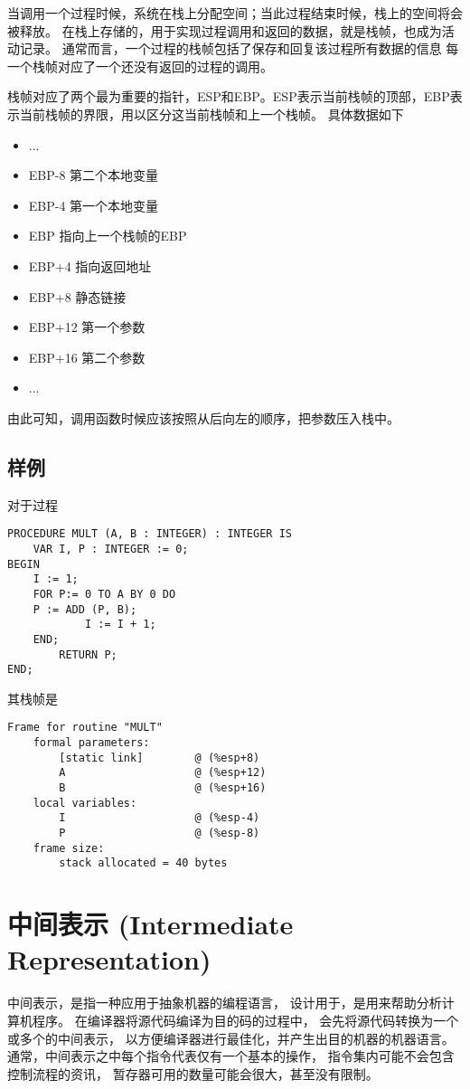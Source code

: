 ﻿\documentclass{article}
\begin{document}
当调用一个过程时候，系统在栈上分配空间；当此过程结束时候，栈上的空间将会被释放。
在栈上存储的，用于实现过程调用和返回的数据，就是栈帧，也成为活动记录。
通常而言，一个过程的栈帧包括了保存和回复该过程所有数据的信息
每一个栈帧对应了一个还没有返回的过程的调用。

栈帧对应了两个最为重要的指针，ESP和EBP。ESP表示当前栈帧的顶部，EBP表示当前栈帧的界限，用以区分这当前栈帧和上一个栈帧。
具体数据如下
\begin{itemize}
\item ...
\item{EBP-8} 第二个本地变量
\item{EBP-4} 第一个本地变量
\item{EBP} 指向上一个栈帧的EBP
\item{EBP+4} 指向返回地址
\item{EBP+8} 静态链接
\item{EBP+12} 第一个参数
\item{EBP+16} 第二个参数
\item ...
\end{itemize}

由此可知，调用函数时候应该按照从后向左的顺序，把参数压入栈中。

\subsection{样例}
对于过程
\begin{lstlisting}
PROCEDURE MULT (A, B : INTEGER) : INTEGER IS
    VAR I, P : INTEGER := 0;
BEGIN
    I := 1;
    FOR P:= 0 TO A BY 0 DO
    P := ADD (P, B);
            I := I + 1;
    END;
        RETURN P;
END;
\end{lstlisting}

其栈帧是
\begin{lstlisting}
Frame for routine "MULT"
    formal parameters:
        [static link]        @ (%esp+8)
        A                    @ (%esp+12)
        B                    @ (%esp+16)
    local variables:
        I                    @ (%esp-4)
        P                    @ (%esp-8)
    frame size:
        stack allocated = 40 bytes
\end{lstlisting}



\section{中间表示 (Intermediate Representation)}
中间表示，是指一种应用于抽象机器的编程语言，
设计用于，是用来帮助分析计算机程序。
在编译器将源代码编译为目的码的过程中，
会先将源代码转换为一个或多个的中间表示，
以方便编译器进行最佳化，并产生出目的机器的机器语言。
通常，中间表示之中每个指令代表仅有一个基本的操作，
指令集内可能不会包含控制流程的资讯，
暂存器可用的数量可能会很大，甚至没有限制。
\end{document}

